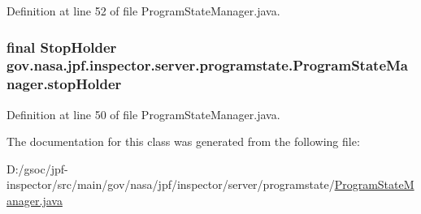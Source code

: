 Definition at line 52 of file Program\+State\+Manager.\+java.

\subsubsection[{\texorpdfstring{stop\+Holder}{stopHolder}}]{\setlength{\rightskip}{0pt plus 5cm}final {\bf Stop\+Holder} gov.\+nasa.\+jpf.\+inspector.\+server.\+programstate.\+Program\+State\+Manager.\+stop\+Holder\hspace{0.3cm}{\ttfamily [private]}}\hypertarget{classgov_1_1nasa_1_1jpf_1_1inspector_1_1server_1_1programstate_1_1_program_state_manager_a81892c2dbe16ef208fdd688bc0ff7c8f}{}\label{classgov_1_1nasa_1_1jpf_1_1inspector_1_1server_1_1programstate_1_1_program_state_manager_a81892c2dbe16ef208fdd688bc0ff7c8f}


Definition at line 50 of file Program\+State\+Manager.\+java.



The documentation for this class was generated from the following file\+:\begin{DoxyCompactItemize}
\item 
D\+:/gsoc/jpf-\/inspector/src/main/gov/nasa/jpf/inspector/server/programstate/\hyperlink{_program_state_manager_8java}{Program\+State\+Manager.\+java}\end{DoxyCompactItemize}
